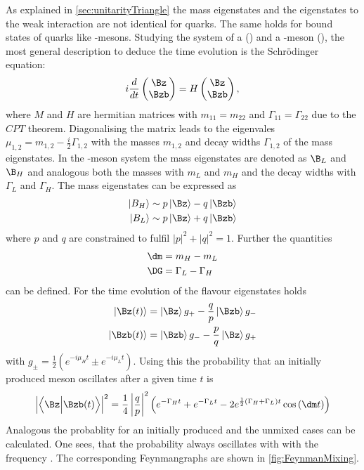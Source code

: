 As explained in \cref{sec:unitarityTriangle} the mass eigenstates and the eigenstates to the weak interaction are not identical for
quarks. The same holds for bound states of quarks like \B-mesons. Studying the system of a \Bz (\bquarkbar\dquark) and a \Bzb-meson
(\bquark\dquarkbar), the most general description to deduce the time evolution is the Schrödinger equation:
\begin{equation}
i\frac{d}{dt}\begin{pmatrix} \Bz \\ \Bzb \end{pmatrix} = H \begin{pmatrix} \Bz \\ \Bzb \end{pmatrix},
\end{equation}
where $M$ and $H$ are hermitian matrices with $m_{11}=m_{22}$ and $\Gamma_{11}=\Gamma_{22}$ due to the $CPT$ theorem. Diagonalising
the matrix leads to the eigenvales $\mu_{1,2}=m_{1,2}-\frac{i}{2}\Gamma_{1,2}$ with the masses $m_{1,2}$ and decay widths
$\Gamma_{1,2}$  of the mass eigenstates. In the \Bz-meson system the mass eigenstates are denoted as $\B_L$ and $\B_H$ and
analogous both the masses with $m_L$ and $m_H$ and the decay widths with $\Gamma_L$ and $\Gamma_H$. The mass eigenstates
can be expressed as
\begin{equation}
\begin{split}
\left|B_H\right>&\sim p\left|\Bz\right>-q\left|\Bzb\right>\\
\left|B_L\right>&\sim p\left|\Bz\right>+q\left|\Bzb\right>
\end{split}
\end{equation}
where $p$ and $q$ are constrained to fulfil $\left|p\right|^2+\left|q\right|^2=1$. Further the quantities
\begin{align}
\dm&=m_H-m_L\\
\DG&=\Gamma_L-\Gamma_H
\end{align}
can be defined. For the time evolution of the flavour eigenstates holds
\begin{equation}
\begin{split}
\left|\Bz\!\left(t\right)\right>&=\left|\Bz\right>g_+-\frac{q}{p}\left|\Bzb\right>g_-\\
\left|\Bzb\!\left(t\right)\right>&=\left|\Bzb\right>g_--\frac{p}{q}\left|\Bz\right>g_+
\end{split}
\end{equation}
with $g_\pm=\frac{1}{2}\left(e^{-i\mu_Ht}\pm e^{-i\mu_Lt}\right)$. Using this the probability that an initially produced
\Bz meson oscillates after a given time $t$ is
\begin{equation}
\left|\left<\Bz\Big|\Bzb\!\left(t\right)\right>\right|^2=\frac{1}{4}\left|\frac{q}{p}\right|^2
\left(e^{-\Gamma_Ht}+e^{-\Gamma_Lt}-2e^{\frac{1}{2}\left(\Gamma_H+\Gamma_L\right)t}\cos\left(\dm t\right)\right)
\end{equation}
Analogous the probablity for an initially produced \Bzb and the unmixed cases can be calculated. One sees, that the probability
always oscillates with with the frequency \dm. The corresponding Feynmangraphs are shown in \cref{fig:FeynmanMixing}.

